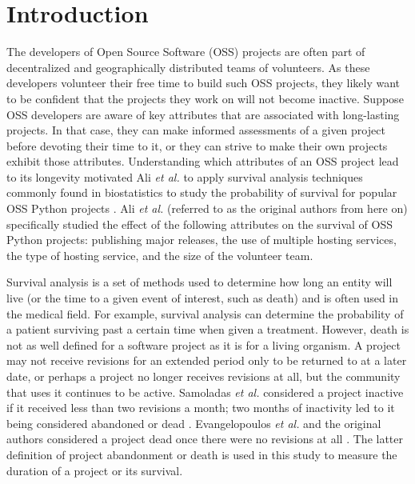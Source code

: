 \documentclass[acmconf]{acmart}
\begin{document}



\maketitle

\section{Introduction} \label{intro}

The developers of Open Source Software (OSS) projects are often part of decentralized and geographically distributed teams of volunteers.
As these developers volunteer their free time to build such OSS projects, they likely want to be confident that the projects they work on will not become inactive.
Suppose OSS developers are aware of key attributes that are associated with long-lasting projects. In that case, they can make informed assessments of a given project before devoting their time to it, or they can strive to make their own projects exhibit those attributes.
Understanding which attributes of an OSS project lead to its longevity motivated Ali \emph{et al.} to apply survival analysis techniques commonly found in biostatistics to study the probability of survival for popular OSS Python projects \cite{ali2020cheating}.
Ali \emph{et al.} (referred to as the original authors from here on) specifically studied the effect of the following attributes on the survival of OSS Python projects: publishing major releases, the use of multiple hosting services, the type of hosting service, and the size of the volunteer team.

Survival analysis is a set of methods used to determine how long an entity will live (or the time to a given event of interest, such as death) and is often used in the medical field.
For example, survival analysis can determine the probability of a patient surviving past a certain time when given a treatment.
However, death is not as well defined for a software project as it is for a living organism.
A project may not receive revisions for an extended period only to be returned to at a later date, or perhaps a project no longer receives revisions at all, but the community that uses it continues to be active.
Samoladas \emph{et al.} considered a project inactive if it received less than two revisions a month; two months of inactivity led to it being considered abandoned or dead \cite{samoladas2010survival}.
Evangelopoulos \emph{et al.} and the original authors considered a project dead once there were no revisions at all \cite{evangelopoulos, ali2020cheating}.
The latter definition of project abandonment or death is used in this study to measure the duration of a project or its survival.
\end{document}

